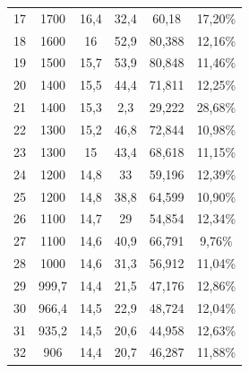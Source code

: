 \begin{longtable}[H]{cccccc}
  17          & 1700                 & 16,4          & 32,4           & 60,18         & 17,20\%                            \\
  18          & 1600                 & 16            & 52,9           & 80,388        & 12,16\%                            \\
  19          & 1500                 & 15,7          & 53,9           & 80,848        & 11,46\%                            \\
  20          & 1400                 & 15,5          & 44,4           & 71,811        & 12,25\%                            \\
  21          & 1400                 & 15,3          & 2,3            & 29,222        & 28,68\%                            \\
  22          & 1300                 & 15,2          & 46,8           & 72,844        & 10,98\%                            \\
  23          & 1300                 & 15            & 43,4           & 68,618        & 11,15\%                            \\
  24          & 1200                 & 14,8          & 33             & 59,196        & 12,39\%                            \\
  25          & 1200                 & 14,8          & 38,8           & 64,599        & 10,90\%                            \\
  26          & 1100                 & 14,7          & 29             & 54,854        & 12,34\%                            \\
  27          & 1100                 & 14,6          & 40,9           & 66,791        & 9,76\%                             \\
  28          & 1000                 & 14,6          & 31,3           & 56,912        & 11,04\%                            \\
  29          & 999,7                & 14,4          & 21,5           & 47,176        & 12,86\%                            \\
  30          & 966,4                & 14,5          & 22,9           & 48,724        & 12,04\%                            \\
  31          & 935,2                & 14,5          & 20,6           & 44,958        & 12,63\%                            \\
  32          & 906                  & 14,4          & 20,7           & 46,287        & 11,88\%                            \\

\end{longtable}
